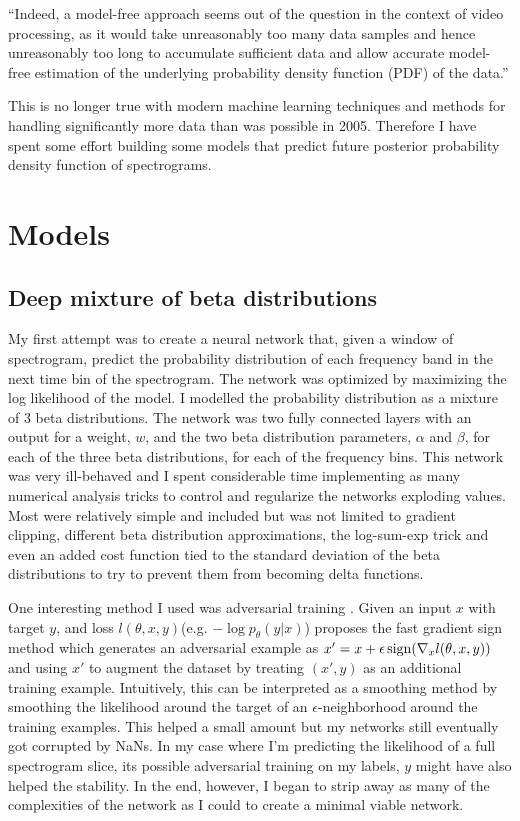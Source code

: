 
``Indeed, a model-free approach seems out of the question in the context of video processing, as it would take unreasonably too many data samples and hence unreasonably too long to accumulate sufficient data and allow accurate model-free estimation of the underlying probability density function (PDF) of the data.'' \cite{itti2005principled}

This is no longer true with modern machine learning techniques and methods for handling significantly more data than was possible in 2005. Therefore I have spent some effort building some models that predict future posterior probability density function of spectrograms.

\section{Models}

\subsection{Deep mixture of beta distributions}
My first attempt was to create a neural network that, given a window of spectrogram, predict the probability distribution of each frequency band in the next time bin of the spectrogram. The network was optimized by maximizing the log likelihood of the model. I modelled the probability distribution as a mixture of 3 beta distributions. The network was two fully connected layers with an output for a weight, $w$, and the two beta distribution parameters, $\alpha$ and $\beta$, for each of the three beta distributions, for each of the frequency bins. This network was very ill-behaved and I spent considerable time implementing as many numerical analysis tricks to control and regularize the networks exploding values. Most were relatively simple and included but was not limited to gradient clipping, different beta distribution approximations, the log-sum-exp trick and even an added cost function tied to the standard deviation of the beta distributions to try to prevent them from becoming delta functions.

One interesting method I used was adversarial training \cite{goodfellow2014explaining,lakshminarayanan2017simple}. Given an input $x$ with target $y$, and loss $l(\theta, x, y)$(e.g. $-\log p_\theta(y|x)$) \cite{goodfellow2014explaining} proposes the fast gradient sign method which generates an adversarial example as $x' = x + \epsilon \operatorname{sign}(\nabla_x l(\theta, x, y))$ and using $x'$ to augment the dataset by treating $(x', y)$ as an additional training example. Intuitively, this can be interpreted as a smoothing method by smoothing the likelihood around the target of an $\epsilon$-neighborhood around the training examples. This helped a small amount but my networks still eventually got corrupted by NaNs. In my case where I'm predicting the likelihood of a full spectrogram slice, its possible adversarial training on my labels, $y$ might have also helped the stability. In the end, however, I began to strip away as many of the complexities of the network as I could to create a minimal viable network.

